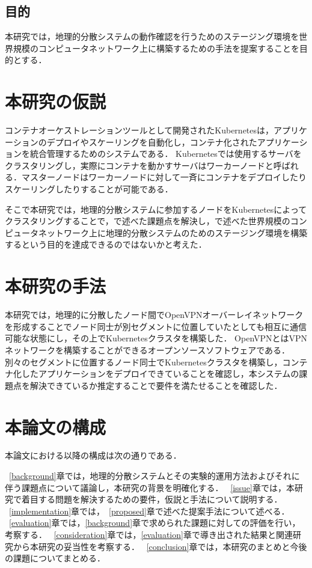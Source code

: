 \subsection{目的}
本研究では，地理的分散システムの動作確認を行うためのステージング環境を世界規模のコンピュータネットワーク上に構築するための手法を提案することを目的とする．

\section{本研究の仮説}
\label{introduction:hypothesis}
コンテナオーケストレーションツールとして開発されたKubernetesは，アプリケーションのデプロイやスケーリングを自動化し，コンテナ化されたアプリケーションを統合管理するためのシステムである．
Kubernetesでは使用するサーバをクラスタリングし，実際にコンテナを動かすサーバはワーカーノードと呼ばれる．マスターノードはワーカーノードに対して一斉にコンテナをデプロイしたりスケーリングしたりすることが可能である．

そこで本研究では，地理的分散システムに参加するノードをKubernetesによってクラスタリングすることで，{}で述べた課題点を解決し，{}で述べた世界規模のコンピュータネットワーク上に地理的分散システムのためのステージング環境を構築するという目的を達成できるのではないかと考えた．

\section{本研究の手法}
\label{introduction:proposal}
本研究では，地理的に分散したノード間でOpenVPNオーバーレイネットワークを形成することでノード同士が別セグメントに位置していたとしても相互に通信可能な状態にし，その上でKubernetesクラスタを構築した．
OpenVPNとはVPNネットワークを構築することができるオープンソースソフトウェアである．
別々のセグメントに位置するノード同士でKubernetesクラスタを構築し，コンテナ化したアプリケーションをデプロイできていることを確認し，本システムの課題点を解決できているか推定することで要件を満たせることを確認した．


\section{本論文の構成}
\label{introduction:structure}
本論文における以降の構成は次の通りである．

~\ref{background}章では，地理的分散システムとその実験的運用方法およびそれに伴う課題点について議論し，本研究の背景を明確化する．
~\ref{issue}章では，本研究で着目する問題を解決するための要件，仮説と手法について説明する．
~\ref{implementation}章では，~\ref{proposed}章で述べた提案手法について述べる．
~\ref{evaluation}章では，\ref{background}章で求められた課題に対しての評価を行い，考察する．
~\ref{consideration}章では，\ref{evaluation}章で導き出された結果と関連研究から本研究の妥当性を考察する．
~\ref{conclusion}章では，本研究のまとめと今後の課題についてまとめる．



